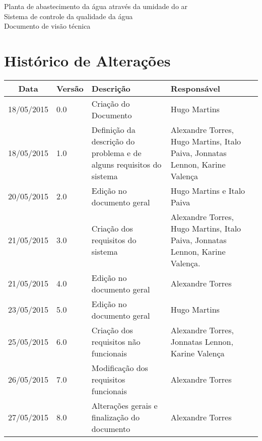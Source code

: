  
 
% 
 
 
 \textual
\begin{center}
 {\large Planta de abastecimento da água através da umidade do ar}\\[0.2cm]
 {Sistema de controle da qualidade da água}\\
 {Documento de visão técnica}\\
 \end{center}
 
 \section*{Histórico de Alterações}
\begin{table}[h]
\centering
\begin{tabular}{|c|p{1.5cm}|p{6cm}|p{5cm}|}\hline
\textbf{Data} & \textbf{Versão} & \textbf{Descrição} & \textbf{Responsável}\\
\hline                               
18/05/2015 & 0.0 & Criação do Documento & Hugo Martins\\
\hline
18/05/2015 & 1.0 & Definição da descrição do problema e de alguns requisitos do sistema & Alexandre Torres,  Hugo Martins, Italo Paiva, Jonnatas Lennon, Karine Valença\\
\hline
20/05/2015 & 2.0 &Edição no documento geral& Hugo Martins e Italo Paiva\\
\hline
21/05/2015 & 3.0 & Criação dos requisitos do sistema & Alexandre Torres, Hugo Martins, Italo Paiva, Jonnatas Lennon, Karine Valença.\\
\hline
21/05/2015&	4.0&Edição no documento geral&Alexandre Torres \\ \hline
23/05/2015&	5.0&	Edição no documento geral&Hugo Martins \\ \hline
25/05/2015&	6.0	&Criação dos requisitos não funcionais	&Alexandre Torres,  Jonnatas Lennon, Karine Valença\\ \hline
26/05/2015	& 7.0 &	Modificação dos requisitos funcionais&	Alexandre Torres\\ \hline
27/05/2015	&8.0&	Alterações gerais  e finalização do documento&	Alexandre Torres\\ \hline

\end{tabular}
\end{table}

